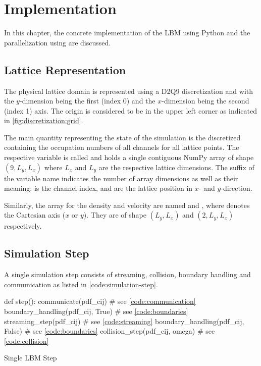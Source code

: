 \section{Implementation}

In this chapter, the concrete implementation of the \gls{LBM} using Python and the parallelization using  are discussed.

\subsection{Lattice Representation}

The physical lattice domain is represented using a D2Q9 discretization and with the $y$-dimension being the first (index 0) and the $x$-dimension being the second (index 1) axis. The origin is considered to be in the upper left corner as indicated in \cref{fig:discretization:grid}.

The main quantity representing the state of the simulation is the discretized  containing the occupation numbers of all channels for all lattice points. The respective variable is called  and holds a single contiguous NumPy array of shape $(9, L_y, L_x)$ where $L_x$ and $L_y$ are the respective lattice dimensions. The suffix of the variable name indicates the number of array dimensions as well as their meaning:  is the channel index,  and  are the lattice position in $x$- and $y$-direction.

Similarly, the array for the density and velocity are named  and , where  denotes the Cartesian axis ($x$ or $y$). They are of shape $(L_y,L_x)$ and $(2,L_y,L_x)$ respectively.

\subsection{Simulation Step}

A single simulation step consists of streaming, collision, boundary handling and communication as listed in \cref{code:simulation-step}.

\begin{listing}[ht!]
    \begin{pycode}
        def step():
            communicate(pdf_cij)                # see \cref{code:communication}
            boundary_handling(pdf_cij, True)    # see \cref{code:boundaries}
            streaming_step(pdf_cij)             # see \cref{code:streaming}
            boundary_handling(pdf_cij, False)   # see \cref{code:boundaries}
            collision_step(pdf_cij, omega)      # see \cref{code:collision}
    \end{pycode}
    \caption{Single \gls{LBM} Step}
    \label{code:simulation-step}
\end{listing}

